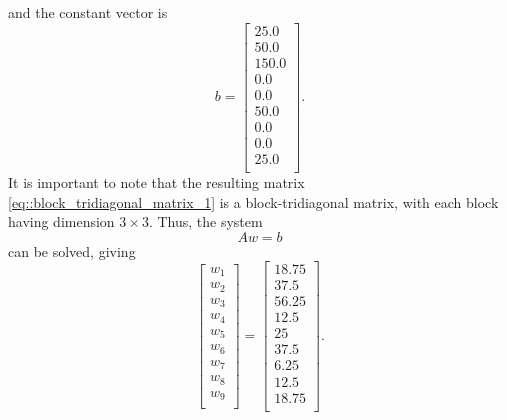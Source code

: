 \documentclass[a4paper]{article}
\begin{document}
and the constant vector is
\begin{equation*}
b =
\begin{bmatrix}
25.0 \\
50.0 \\
150.0 \\
0.0 \\
0.0 \\
50.0 \\
0.0 \\
0.0 \\
25.0 \\
\end{bmatrix}.
\end{equation*}
It is important to note that the resulting matrix \ref{eq::block_tridiagonal_matrix_1} is a block-tridiagonal matrix, with each block having dimension $3\times 3$. Thus, the system
\begin{equation}
Aw=b
\end{equation}
can be solved, giving
\begin{equation}
\begin{bmatrix}
w_1 \\
w_2 \\
w_3 \\
w_4 \\
w_5 \\
w_6 \\
w_7 \\
w_8 \\
w_9 \\
\end{bmatrix}=
\begin{bmatrix}
18.75 \\
37.5 \\
56.25 \\
12.5 \\
25 \\
37.5 \\
6.25 \\
12.5 \\
18.75 \\
\end{bmatrix}.
\end{equation}
\end{document}
